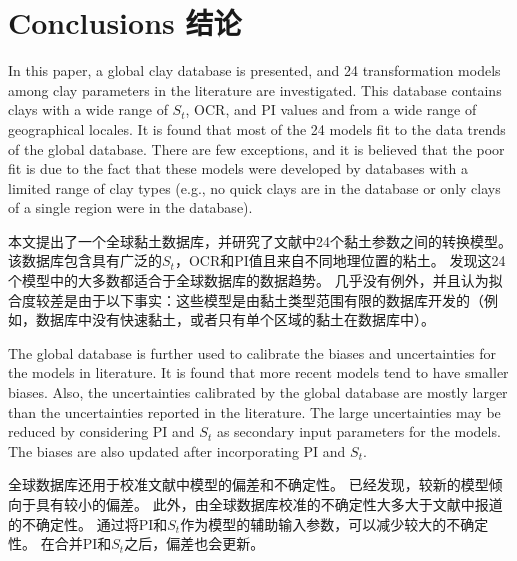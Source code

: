 \section{Conclusions 结论}

\begin{paracol}{2}

    In this paper, a global clay database is presented, and 24 transformation models among clay parameters in the literature are investigated. This database contains clays with a wide range of $S_t$, OCR, and PI values and from a wide range of geographical locales. It is found that most of the 24 models fit to the data trends of the global database. There are few exceptions, and it is believed that the poor fit is due to the fact that these models were developed by databases with a limited range of clay types (e.g., no quick clays are in the database or only clays of a single region were in the database).
        
    \switchcolumn
    
    本文提出了一个全球黏土数据库，并研究了文献中24个黏土参数之间的转换模型。 该数据库包含具有广泛的$S_t$，OCR和PI值且来自不同地理位置的粘土。 发现这24个模型中的大多数都适合于全球数据库的数据趋势。 几乎没有例外，并且认为拟合度较差是由于以下事实：这些模型是由黏土类型范围有限的数据库开发的（例如，数据库中没有快速黏土，或者只有单个区域的黏土在数据库中）。
        
    \switchcolumn*
    
    The global database is further used to calibrate the biases and uncertainties for the models in literature. It is found that more recent models tend to have smaller biases. Also, the uncertainties calibrated by the global database are mostly larger than the uncertainties reported in the literature. The large uncertainties may be reduced by considering PI and $S_t$ as secondary input parameters for the models. The biases are also updated after incorporating PI and $S_t$.
        
    \switchcolumn
    
    全球数据库还用于校准文献中模型的偏差和不确定性。 已经发现，较新的模型倾向于具有较小的偏差。 此外，由全球数据库校准的不确定性大多大于文献中报道的不确定性。 通过将PI和$S_t$作为模型的辅助输入参数，可以减少较大的不确定性。 在合并PI和$S_t$之后，偏差也会更新。
        
\end{paracol}